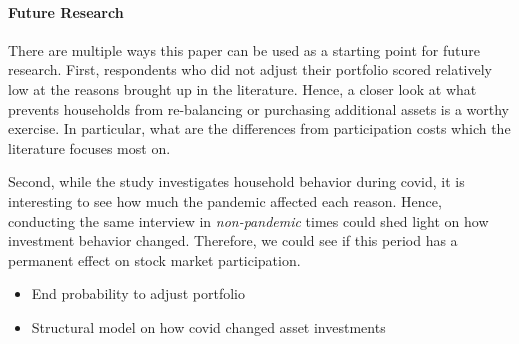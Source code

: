 \documentclass[ProjectABM]{subfiles}
\begin{document}

\paragraph{Future Research}
There are multiple ways this paper can be used as a starting point for future research. First, respondents who did not adjust their portfolio scored relatively low at the reasons brought up in the literature. Hence, a closer look at what prevents households from re-balancing or purchasing additional assets is a worthy exercise. In particular, what are the differences from participation costs which the literature focuses most on.

Second, while the study investigates household behavior during covid, it is interesting to see how much the pandemic affected each reason. Hence, conducting the same interview in \textit{non-pandemic} times could shed light on how investment behavior changed. Therefore, we could see if this period has a permanent effect on stock market participation.

\begin{itemize}
	\item End probability to adjust portfolio
	\item Structural model on how covid changed asset investments
\end{itemize}



\end{document}
